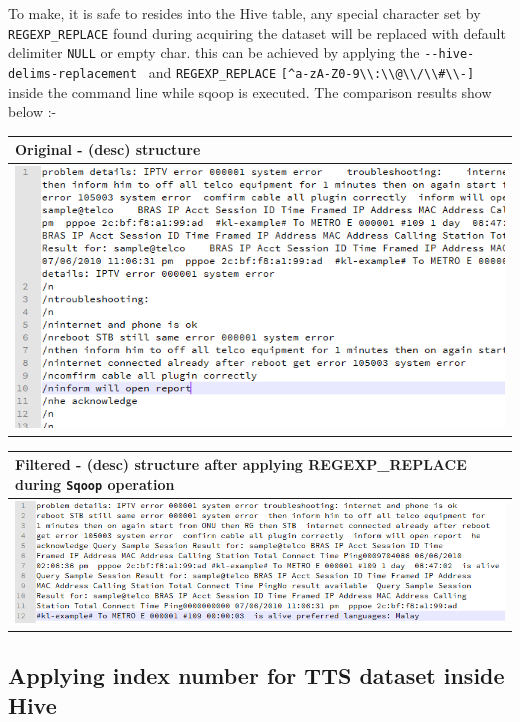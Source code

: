 \documentclass[]{article}
\begin{document}
To make, it is safe to resides into the Hive table, any special
character set by \texttt{REGEXP\_REPLACE} found during acquiring the
dataset will be replaced with default delimiter \texttt{NULL} or empty
char. this can be achieved by applying the
\texttt{-\/-hive-delims-replacement \textquotesingle{}\textquotesingle{}}
and \texttt{REGEXP\_REPLACE}
\texttt{{[}\^{}a-zA-Z0-9\textbackslash{}\textbackslash{}:\textbackslash{}\textbackslash{}@\textbackslash{}\textbackslash{}/\textbackslash{}\textbackslash{}\#\textbackslash{}\textbackslash{}-{]}}
inside the command line while sqoop is executed. The comparison results
show below :-

\begin{longtable}[c]{@{}l@{}}
\toprule
Original - (desc) structure\tabularnewline
\midrule
\endhead
\includegraphics{before.png}\tabularnewline
\bottomrule
\end{longtable}

\begin{longtable}[c]{@{}l@{}}
\toprule
Filtered - (desc) structure after applying REGEXP\_REPLACE during
\texttt{Sqoop} operation\tabularnewline
\midrule
\endhead
\includegraphics{after.png}\tabularnewline
\bottomrule
\end{longtable}

\subsection{Applying index number for TTS dataset inside
Hive}\label{applying-index-number-for-tts-dataset-inside-hive}
\end{document}
